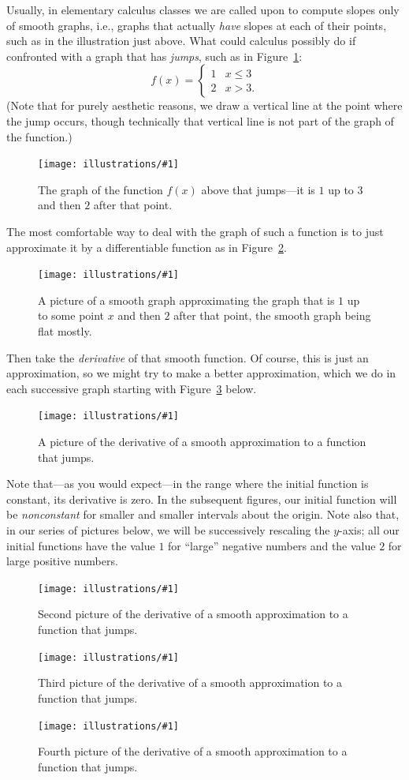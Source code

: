 \documentclass[openany]{book}
\newcommand{\ill}[3]{%
   \begin{figure}[H]%
   \vspace{-2ex}
   \centering%
   \texttt{[image: illustrations/\#1]}%
   \caption{#3}%
   \vspace{-2ex}
    \end{figure}}
\theoremstyle{plain}
\theoremstyle{definition}
\begin{document}
{Usually, in elementary calculus classes we are called upon to compute
slopes only of smooth graphs, i.e., graphs that actually {\em have}
slopes at each of their points, such as in the illustration just
above.  What could calculus possibly do if confronted with a graph
that has {\em jumps}, such as in Figure~\ref{fig:jump}:
$$f(x) = \begin{cases}1 & x \leq 3\\ 2 & x > 3.\end{cases}$$
(Note that for purely aesthetic reasons, we draw a vertical line at the point where the jump occurs, though technically that vertical line is not part of the graph of the function.)

\ill{jump}{0.5}{The graph of the function $f(x)$ above that jumps---it is $1$ up to $3$ and then $2$ after that point.\label{fig:jump}}


The most comfortable way to deal with the graph of such a function is
to just approximate it by a differentiable function as in
Figure~\ref{fig:jumpsmooth}. %


\ill{jump-smooth}{0.5}{A picture of a smooth graph approximating the
  graph that is $1$ up to some point $x$ and then $2$ after that
  point, the smooth graph being flat mostly.\label{fig:jumpsmooth}}


Then take the {\em derivative} of that smooth function.  Of course,
this is just an approximation, so we might try to make a better
approximation, which we do in each successive graph starting
with Figure~\ref{fig:djump1} below.


\ill{jump-smooth-deriv-7}{0.6}{A picture of the derivative of
a smooth approximation to a function that jumps.\label{fig:djump1}}

Note that---as you would expect---in the range where the initial
function is constant, its derivative is zero. In the subsequent
figures, our initial function will be {\it nonconstant} for smaller
and smaller intervals about the origin. Note also that, in our series
of pictures below, we will be successively rescaling the $y$-axis; all
our initial functions have the value $1$ for ``large'' negative numbers
and the value $2$ for large positive numbers.

\ill{jump-smooth-deriv-2}{0.5}{Second picture of the derivative of
a smooth approximation to a function that jumps.\label{fig:djump2}}
\ill{jump-smooth-deriv-05}{0.5}{Third picture of the derivative of
a smooth approximation to a function that jumps.\label{fig:djump3}}
\ill{jump-smooth-deriv-01}{0.5}{Fourth picture of the derivative of
a smooth approximation to a function that jumps.\label{fig:djump4}}


}
\end{document}
